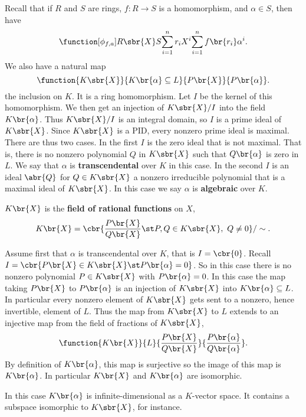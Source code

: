 Recall that if $ R $ and $ S $ are rings, $ f : R \to S $ is a homomorphism, and $ \alpha \in S $, then have
$$ \function[\phi_{f, a}]{R\sbr{X}}{S}{\sum_{i = 1}^n r_iX^i}{\sum_{i = 1}^n f\br{r_i}\alpha^i}. $$
We also have a natural map
$$ \function{K\sbr{X}}{K\br{\alpha} \subseteq L}{P\br{X}}{P\br{\alpha}}. $$
the inclusion on $ K $. It is a ring homomorphism. Let $ I $ be the kernel of this homomorphism. We then get an injection of $ K\sbr{X} / I $ into the field $ K\br{\alpha} $. Thus $ K\sbr{X} / I $ is an integral domain, so $ I $ is a prime ideal of $ K\sbr{X} $. Since $ K\sbr{X} $ is a PID, every nonzero prime ideal is maximal. There are thus two cases. In the first $ I $ is the zero ideal that is not maximal. That is, there is no nonzero polynomial $ Q $ in $ K\sbr{X} $ such that $ Q\br{\alpha} $ is zero in $ L $. We say that $ \alpha $ is \textbf{transcendental} over $ K $ in this case. In the second $ I $ is an ideal $ \abr{Q} $ for $ Q \in K\sbr{X} $ a nonzero irreducible polynomial that is a maximal ideal of $ K\sbr{X} $. In this case we say $ \alpha $ is \textbf{algebraic} over $ K $.

\begin{definition}
$ K\br{X} $ is the \textbf{field of rational functions} on $ X $,
$$ K\br{X} = \cbr{\dfrac{P\br{X}}{Q\br{X}} \st P, Q \in K\sbr{X}, \ Q \ne 0} / \sim. $$
\end{definition}

Assume first that $ \alpha $ is transcendental over $ K $, that is $ I = \cbr{0} $. Recall $ I = \cbr{P\br{X} \in K\sbr{X} \st P\br{\alpha} = 0} $. So in this case there is no nonzero polynomial $ P \in K\sbr{X} $ with $ P\br{\alpha} = 0 $. In this case the map taking $ P\br{X} $ to $ P\br{\alpha} $ is an injection of $ K\sbr{X} $ into $ K\br{\alpha} \subseteq L $. In particular every nonzero element of $ K\sbr{X} $ gets sent to a nonzero, hence invertible, element of $ L $. Thus the map from $ K\sbr{X} $ to $ L $ extends to an injective map from the field of fractions of $ K\sbr{X} $,
$$ \function{K\br{X}}{L}{\dfrac{P\br{X}}{Q\br{X}}}{\dfrac{P\br{\alpha}}{Q\br{\alpha}}}. $$
By definition of $ K\br{\alpha} $, this map is surjective so the image of this map is $ K\br{\alpha} $. In particular $ K\br{X} $ and $ K\br{\alpha} $ are isomorphic.

\begin{note*}
In this case $ K\br{\alpha} $ is infinite-dimensional as a $ K $-vector space. It contains a subspace isomorphic to $ K\sbr{X} $, for instance.
\end{note*}


